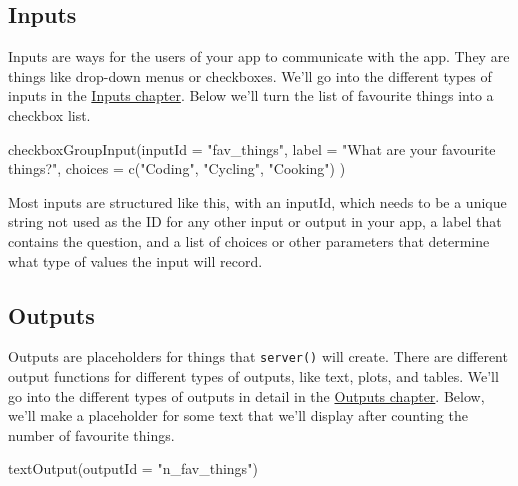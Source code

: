 \documentclass[
]{book}
\newenvironment{Shaded}{\begin{snugshade}}{\end{snugshade}}
\newcommand{\AttributeTok}[1]{\textcolor[rgb]{0.77,0.63,0.00}{#1}}
\newcommand{\FunctionTok}[1]{\textcolor[rgb]{0.00,0.00,0.00}{#1}}
\newcommand{\NormalTok}[1]{#1}
\newcommand{\StringTok}[1]{\textcolor[rgb]{0.31,0.60,0.02}{#1}}
\begin{document}
\hypertarget{inputs-intro}{%
\subsection{Inputs}\label{inputs-intro}}

Inputs are ways for the users of your app to communicate with the app. They are things like drop-down menus or checkboxes. We'll go into the different types of inputs in the \protect\hyperlink{inputs}{Inputs chapter}. Below we'll turn the list of favourite things into a checkbox list.

\begin{Shaded}
\begin{Highlighting}[]
\FunctionTok{checkboxGroupInput}\NormalTok{(}\AttributeTok{inputId =} \StringTok{"fav\_things"}\NormalTok{, }
                   \AttributeTok{label =} \StringTok{"What are your favourite things?"}\NormalTok{,}
                   \AttributeTok{choices =} \FunctionTok{c}\NormalTok{(}\StringTok{"Coding"}\NormalTok{, }\StringTok{"Cycling"}\NormalTok{, }\StringTok{"Cooking"}\NormalTok{)}
\NormalTok{)}
\end{Highlighting}
\end{Shaded}

Most inputs are structured like this, with an inputId, which needs to be a unique string not used as the ID for any other input or output in your app, a label that contains the question, and a list of choices or other parameters that determine what type of values the input will record.

\hypertarget{outputs-intro}{%
\subsection{Outputs}\label{outputs-intro}}

Outputs are placeholders for things that \texttt{server()} will create. There are different output functions for different types of outputs, like text, plots, and tables. We'll go into the different types of outputs in detail in the \protect\hyperlink{outputs}{Outputs chapter}. Below, we'll make a placeholder for some text that we'll display after counting the number of favourite things.

\begin{Shaded}
\begin{Highlighting}[]
\FunctionTok{textOutput}\NormalTok{(}\AttributeTok{outputId =} \StringTok{"n\_fav\_things"}\NormalTok{)}
\end{Highlighting}
\end{Shaded}
\end{document}
